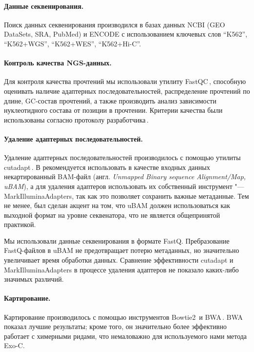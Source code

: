 \documentclass[a4paper,14pt]{extarticle}
\newcommand{\utilname}[1]{\textenglish{#1}}
\newcommand{\ecitep}[1]{\textenglish{\citep{#1}}}
\newcommand{\engterm}[1]{англ. \textenglish{\textit{#1}}}
\begin{document}
\paragraph{Данные секвенирования.}
Поиск данных секвенирования производился в базах данных NCBI (GEO DataSets, SRA, PubMed) и ENCODE с использованием ключевых слов ``K562'', ``K562+WGS'', ``K562+WES'', ``K562+Hi-C''.

\paragraph{Контроль качества NGS\hyp{}данных.}
Для контроля качества прочтений мы использовали утилиту \utilname{FastQC}\,\ecitep{FastQC}, способную оценивать наличие адаптерных последовательностей, распределение прочтений по длине, GC-состав прочтений, а также производить анализ зависимости нуклеотидного состава от позиции в прочтении.
Критерии качества были использованы согласно протоколу разработчика\,\ecitep{FastQC}.

\paragraph{Удаление адаптерных последовательностей.}
Удаление адаптерных последовательностей производилось с помощью утилиты \utilname{cutadapt}\,\ecitep{Martin_2011}.
В \citet{Auwera_2013} рекомендуется использовать в качестве входных данных некартированный BAM-файл (\engterm{Unmapped Binary sequence Alignment/Map, uBAM}), а для удаления адаптеров использовать их собственный инструмент "--- \utilname{MarkIlluminaAdapters}, так как это позволяет сохранить важные метаданные.
Тем не менее, был сделан акцент на том, что uBAM должен использоваться как выходной формат на уровне секвенатора, что не является общепринятой практикой.

Мы использовали данные секвенирования в формате FastQ.
Пребразование FastQ-файлов в uBAM не предотвращает потерю метаданных, но значительно увеличивает время обработки данных.
Сравнение эффективности \utilname{cutadapt} и \utilname{MarkIlluminaAdapters} в процессе удаления адаптеров не показало каких-либо значимых различий.

\paragraph{Картирование.}
Картирование производилось с помощью инструментов \utilname{Bow\-tie2}\,\ecitep{Langmead_2012} и \utilname{BWA}\,\ecitep{Li_2009}.
\utilname{BWA} показал лучшие результаты;
кроме того, он значительно более эффективно работает с химерными ридами, что немаловажно для используемого нами метода Exo-C.
\end{document}
